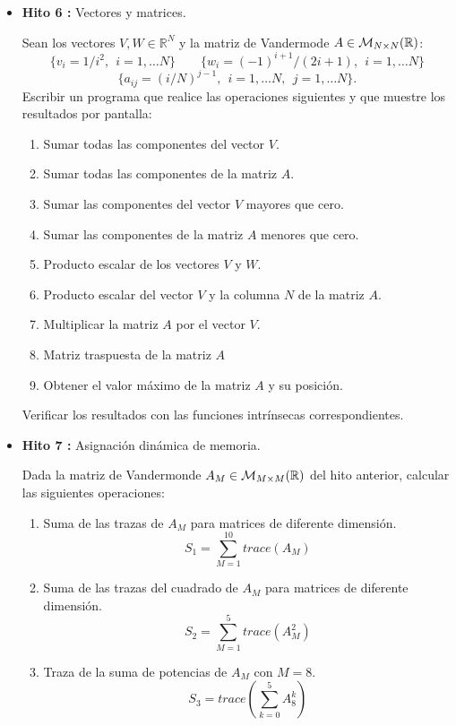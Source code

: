 \documentclass[12pt,spanish]{article}
\begin{document}
\begin{itemize}
\begin{enumerate}
\end{enumerate}         

\newpage
\item {\bf Hito 6 :}   Vectores y matrices. 

Sean los vectores $V, W \in \mathbb{R}^N$ y la matriz de Vandermode $A \in 
{\cal M}_{N \times N} (\mathbb{R})$: 
$$
\{ v_i =  1/i^2, \ \  i=1, \ldots N \} \qquad  \{  w_i = (-1)^{i+1}/(2i+1), \ \   i=1, \ldots N  \} 
$$
$$
\{ a_{ij} = (i/N)^{j-1}, \ \ i=1, \ldots N, \ \  j=1, \ldots N \}. 
$$
Escribir un programa que realice las operaciones siguientes y que muestre los
resultados por pantalla: 
\begin{enumerate}
	\item Sumar todas las componentes del vector $V$. 
	\item Sumar todas las componentes de la matriz $A$.   
	\item Sumar las componentes del vector $V$ mayores que cero.
	\item Sumar las componentes de la matriz $A$ menores que cero.   
	\item Producto escalar de los vectores $V$ y $W$.   
	\item Producto escalar del vector $V$ y la columna $N$ de la matriz $A$. 
	\item Multiplicar la matriz $A$ por el vector $V$.
	\item Matriz traspuesta de la matriz $A$   
	\item Obtener el valor máximo de la matriz $A$ y su posición.
\end{enumerate}

Verificar los resultados con las funciones intrínsecas correspondientes. 


\item {\bf Hito 7 :}   Asignación dinámica de memoria.

Dada la matriz  de Vandermonde $A_M \in {\cal M}_{M \times M} (\mathbb{R})$ del hito anterior,
calcular las siguientes operaciones: 


\begin{enumerate}	
	\item Suma de las trazas de $ A_M $ para matrices de diferente dimensión. 
	$$  S_1 = \sum_{M=1} ^{10} trace(A_M) $$ 
	\item  Suma de las trazas del cuadrado de $ A_M $ para matrices de diferente dimensión. 
	$$  S_2 = \sum_{M=1} ^{5} trace(A_M^2) $$ 
	\item Traza de la suma de potencias de $ A_M $  con $ M=8 $.
	$$  S_3 = trace \left( \sum_{k=0} ^{5} A_8^k  \right) $$
\end{enumerate}  
 

\end{itemize}
\end{document}
